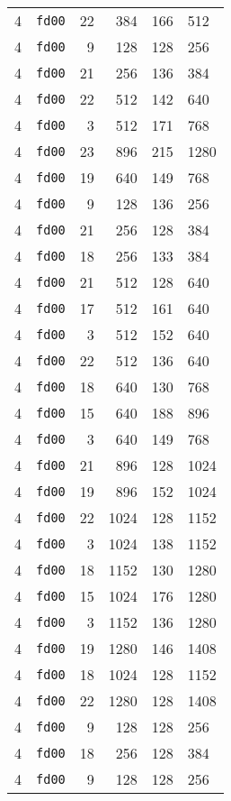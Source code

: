 \documentclass{article}
\begin{document}
\begin{table}[h!]
\begin{tabular}{llrrrl}
    4 & \texttt{fd00} & 22 & 384 & 166 & 512 \\
    4 & \texttt{fd00} & 9 & 128 & 128 & 256 \\
    4 & \texttt{fd00} & 21 & 256 & 136 & 384 \\
    4 & \texttt{fd00} & 22 & 512 & 142 & 640 \\
    4 & \texttt{fd00} & 3 & 512 & 171 & 768 \\
    4 & \texttt{fd00} & 23 & 896 & 215 & 1280 \\
    4 & \texttt{fd00} & 19 & 640 & 149 & 768 \\
    4 & \texttt{fd00} & 9 & 128 & 136 & 256 \\
    4 & \texttt{fd00} & 21 & 256 & 128 & 384 \\
    4 & \texttt{fd00} & 18 & 256 & 133 & 384 \\
    4 & \texttt{fd00} & 21 & 512 & 128 & 640 \\
    4 & \texttt{fd00} & 17 & 512 & 161 & 640 \\
    4 & \texttt{fd00} & 3 & 512 & 152 & 640 \\
    4 & \texttt{fd00} & 22 & 512 & 136 & 640 \\
    4 & \texttt{fd00} & 18 & 640 & 130 & 768 \\
    4 & \texttt{fd00} & 15 & 640 & 188 & 896 \\
    4 & \texttt{fd00} & 3 & 640 & 149 & 768 \\
    4 & \texttt{fd00} & 21 & 896 & 128 & 1024 \\
    4 & \texttt{fd00} & 19 & 896 & 152 & 1024 \\
    4 & \texttt{fd00} & 22 & 1024 & 128 & 1152 \\
    4 & \texttt{fd00} & 3 & 1024 & 138 & 1152 \\
    4 & \texttt{fd00} & 18 & 1152 & 130 & 1280 \\
    4 & \texttt{fd00} & 15 & 1024 & 176 & 1280 \\
    4 & \texttt{fd00} & 3 & 1152 & 136 & 1280 \\
    4 & \texttt{fd00} & 19 & 1280 & 146 & 1408 \\
    4 & \texttt{fd00} & 18 & 1024 & 128 & 1152 \\
    4 & \texttt{fd00} & 22 & 1280 & 128 & 1408 \\
    4 & \texttt{fd00} & 9 & 128 & 128 & 256 \\
    4 & \texttt{fd00} & 18 & 256 & 128 & 384 \\
    4 & \texttt{fd00} & 9 & 128 & 128 & 256 \\

\end{tabular}
\end{table}
\end{document}
